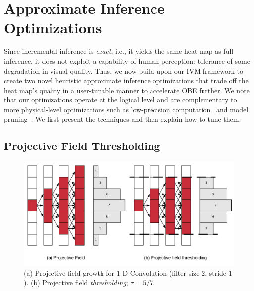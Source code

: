 \vspace{-2mm}
\section{Approximate Inference Optimizations}\label{sec:approx}
Since incremental inference is \textit{exact}, i.e., it yields the same heat map as full inference, it does not exploit a capability of human perception: tolerance of some degradation in visual quality. Thus, we now build upon our IVM framework to create two novel heuristic approximate inference optimizations that trade off the heat map's quality in a user-tunable manner to accelerate OBE further. 
We note that our optimizations operate at the logical level and are complementary to more physical-level optimizations such as low-precision computation~\cite{moons20160} and model pruning~\cite{he2017channel}.
We first present the techniques and then explain how to tune them.

\subsection{Projective Field Thresholding}

\begin{figure}[t]
\includegraphics[width=\columnwidth]{images/pf_truncate}
\vspace{-8mm}
\caption{(a) Projective field growth for 1-D Convolution (filter size $2$, stride $1$). (b) Projective field \textit{thresholding}; $\tau = 5/7$.}
\label{fig:pf_truncate}
\vspace{-2mm}
\end{figure}


